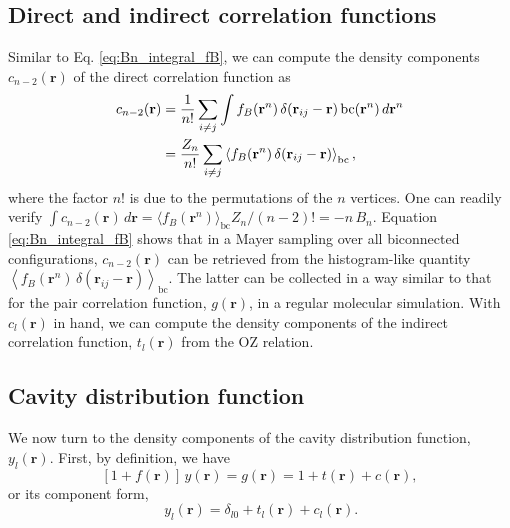 \documentclass[aip,jcp,preprint,superscriptaddress,showpacs,preprintnumbers,amsmath,amssymb]{revtex4-1}
\numberwithin{equation}{section}
\newcommand{\vct}[1]{\mathbf{#1}}
\providecommand{\vr}{} %
\renewcommand{\vr}{\vct{r}}
\begin{document}
\subsection{Direct and indirect correlation functions}





Similar to Eq. \eqref{eq:Bn_integral_fB},
we can compute the density components $c_{n-2}(\vr)$
of the direct correlation function as
%
%
%
\begin{align}
c_{n-2}(\vr)
&=
\frac{1}{n!}
\sum_{i \ne j}
\int
  f_B(\vr^n) \, \delta(\vr_{ij} - \vr) \,
  \mathrm{bc}(\vr^n) \, d\vr^n
\notag \\
&=
\frac{Z_n}{n!}
\sum_{i \ne j}
\left\langle
  f_B(\vr^n) \,
  \delta(\vr_{ij} - \vr)
\right\rangle_{\mathrm{bc}},
\label{eq:cr_mayer}
\end{align}
%
%
%
where the factor $n!$ is due to the permutations of
the $n$ vertices.
%
One can readily verify
%
%
%
%
%
%
$\int c_{n-2}(\vr) \, d\vr
= \langle f_B(\vr^n) \rangle_\mathrm{bc}
Z_n / (n - 2)! = -n \, B_n$.
%
%
%
Equation \eqref{eq:Bn_integral_fB}
shows that in a Mayer sampling over
all biconnected configurations,
$c_{n-2}(\vr)$ can be retrieved from
the histogram-like quantity
$\left\langle
  f_B(\vr^n) \, \delta(\vr_{ij} - \vr)
\right\rangle_\mathrm{bc}$.
%
The latter can be collected in a way
similar to that for the pair correlation function, $g(\vr)$,
in a regular molecular simulation.
%
With $c_l(\vr)$ in hand,
we can compute the density components of
the indirect correlation function, $t_l(\vr)$
from the OZ relation.





\subsection{Cavity distribution function}





We now turn to the density components of
the cavity distribution function, $y_l(\vr)$.
%
First, by definition, we have
%
%
%
\[
[1 + f(\vr)] \, y(\vr)
= g(\vr)
= 1 + t(\vr) + c(\vr),
\]
%
%
%
or its component form,
%
%
%
\begin{equation}
[1 + f(\vr)] \, y_l(\vr)
= \delta_{l0} + t_l(\vr) + c_l(\vr).
\label{eq:closure_component}
\end{equation}
\end{document}
